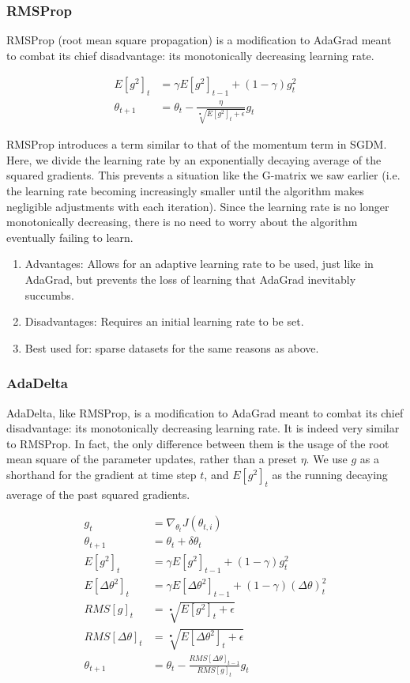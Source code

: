 \documentclass[twoside,11pt]{homework}
\begin{document}
\subsubsection*{RMSProp}
RMSProp (root mean square propagation) is a modification to AdaGrad meant to combat its chief disadvantage: its monotonically decreasing learning rate.

\begin{align*}
	E[g^2]_t &= \gamma E[g^2]_{t-1} + (1-\gamma)g^2_t\\
	\theta_{t+1} &= \theta_t - \frac{\eta}{\sqrt[•]{E[g^2]_t+\epsilon}} g_t
\end{align*}

RMSProp introduces a term similar to that of the momentum term in SGDM. Here, we divide the learning rate by an exponentially decaying average of the squared gradients. This prevents a situation like the G-matrix we saw earlier (i.e. the learning rate becoming increasingly smaller until the algorithm makes negligible adjustments with each iteration). Since the learning rate is no longer monotonically decreasing, there is no need to worry about the algorithm eventually failing to learn.

\begin{enumerate}
	\item Advantages: Allows for an adaptive learning rate to be used, just like in AdaGrad, but prevents the loss of learning that AdaGrad inevitably succumbs.
	\item Disadvantages: Requires an initial learning rate to be set.
	\item Best used for: sparse datasets for the same reasons as above.
\end{enumerate}

\subsubsection*{AdaDelta}
AdaDelta, like RMSProp, is a modification to AdaGrad meant to combat its chief disadvantage: its monotonically decreasing learning  rate. It is indeed very similar to RMSProp. In fact, the only difference between them is the usage of the root mean square of the parameter updates, rather than a preset $\eta$. We use $g$ as a shorthand for the gradient at time step $t$, and $E[g^2]_t$ as the running decaying average of the past squared gradients.

\begin{align*}
	g_t &= \nabla_{\theta_t} J(\theta_{t, i})\\
	\theta_{t+1} &= \theta_t + \delta \theta_t\\
	E[g^2]_t &= \gamma E[g^2]_{t-1} + (1-\gamma)g^2_t \\
	E[\Delta \theta^2]_t &= \gamma E[\Delta \theta^2]_{t-1} + (1-\gamma)(\Delta \theta)^2_t \\
	RMS[g]_t &= \sqrt[•]{E[g^2]_t+\epsilon}\\
	RMS[\Delta \theta]_t &= \sqrt[•]{E[\Delta \theta^2]_t+\epsilon}\\
	\theta_{t+1} &= \theta_t - \frac{RMS[\Delta \theta]_{t-1}}{RMS[g]_t} g_t\\
\end{align*}
\end{document}
